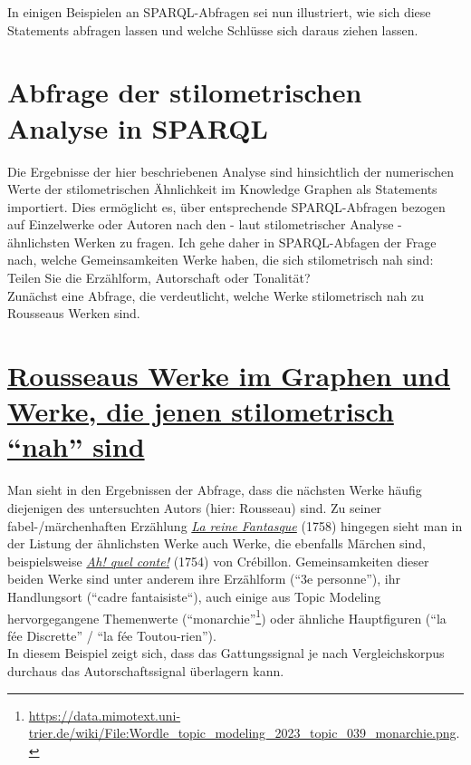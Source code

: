 \documentclass[
  12pt,
  letterpaper,
  DIV=11,
  numbers=noendperiod]{scrreprt}
\begin{document}
In einigen Beispielen an SPARQL-Abfragen sei nun illustriert, wie sich
diese Statements abfragen lassen und welche Schlüsse sich daraus ziehen
lassen.

\section{Abfrage der stilometrischen Analyse in
SPARQL}\label{abfrage-der-stilometrischen-analyse-in-sparql}

Die Ergebnisse der hier beschriebenen Analyse sind hinsichtlich der
numerischen Werte der stilometrischen Ähnlichkeit im Knowledge Graphen
als Statements importiert. Dies ermöglicht es, über entsprechende
SPARQL-Abfragen bezogen auf Einzelwerke oder Autoren nach den - laut
stilometrischer Analyse - ähnlichsten Werken zu fragen. Ich gehe daher
in SPARQL-Abfagen der Frage nach, welche Gemeinsamkeiten Werke haben,
die sich stilometrisch nah sind: Teilen Sie die Erzählform, Autorschaft
oder Tonalität?\\
Zunächst eine Abfrage, die verdeutlicht, welche Werke stilometrisch nah
zu Rousseaus Werken sind.

\section{\texorpdfstring{\href{http://tinyurl.com/ylafpk9d}{Rousseaus
Werke im Graphen und Werke, die jenen stilometrisch ``nah''
sind}}{Rousseaus Werke im Graphen und Werke, die jenen stilometrisch ``nah'' sind}}\label{rousseaus-werke-im-graphen-und-werke-die-jenen-stilometrisch-nah-sind}

Man sieht in den Ergebnissen der Abfrage, dass die nächsten Werke häufig
diejenigen des untersuchten Autors (hier: Rousseau) sind. Zu seiner
fabel-/märchenhaften Erzählung
\href{https://data.mimotext.uni-trier.de/wiki/Item:Q1379}{\emph{La reine
Fantasque}} (1758) hingegen sieht man in der Listung der ähnlichsten
Werke auch Werke, die ebenfalls Märchen sind, beispielsweise
\href{https://data.mimotext.uni-trier.de/wiki/Item:Q1013}{\emph{Ah! quel
conte!}} (1754) von Crébillon. Gemeinsamkeiten dieser beiden Werke sind
unter anderem ihre Erzählform (``3e personne''), ihr Handlungsort
(``cadre fantaisiste``), auch einige aus Topic Modeling hervorgegangene
Themenwerte (``monarchie''\footnote{\url{https://data.mimotext.uni-trier.de/wiki/File:Wordle_topic_modeling_2023_topic_039_monarchie.png}.})
oder ähnliche Hauptfiguren (``la fée Discrette'' / ``la fée
Toutou-rien'').\\
In diesem Beispiel zeigt sich, dass das Gattungssignal je nach
Vergleichskorpus durchaus das Autorschaftssignal überlagern kann.
\end{document}
